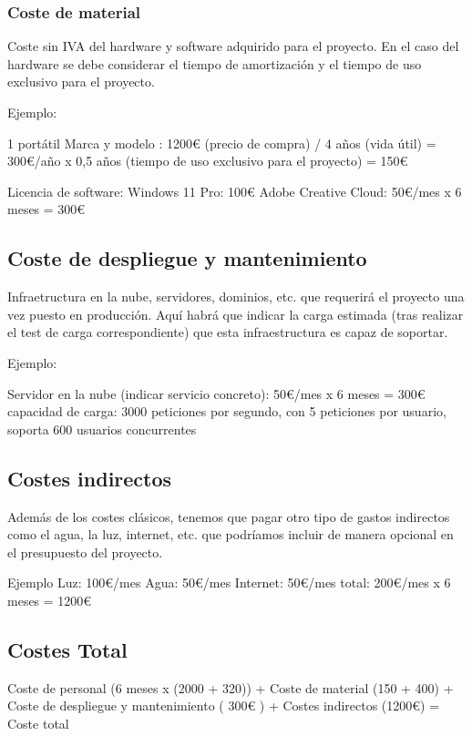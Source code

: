 \subsubsection{Coste de material}

Coste sin IVA del hardware y software adquirido para el proyecto.
En el caso del hardware se debe considerar el tiempo de amortización y el tiempo de uso exclusivo para el proyecto.

Ejemplo:

1 portátil Marca y modelo : 1200€ (precio de compra) / 4 años (vida útil) = 300€/año x 0,5 años (tiempo de uso exclusivo para el proyecto) = 150€

Licencia de software: 
Windows 11 Pro: 100€
Adobe Creative Cloud: 50€/mes x 6 meses = 300€


\subsection{Coste de despliegue y mantenimiento}

Infraetructura en la nube, servidores, dominios, etc. que requerirá el proyecto una vez puesto en producción. Aquí habrá que indicar la carga estimada (tras realizar el test de carga correspondiente) que esta infraestructura es capaz de soportar.

Ejemplo:

Servidor en la nube (indicar servicio concreto): 50€/mes x 6 meses = 300€
    capacidad de carga: 3000 peticiones por segundo, con 5 peticiones por usuario, soporta 600 usuarios concurrentes
        
\subsection{Costes indirectos}

Además de los costes clásicos, tenemos que pagar otro tipo de gastos indirectos como el agua, la luz, internet, etc. que podríamos incluir de manera opcional en el presupuesto del proyecto.

Ejemplo
    Luz: 100€/mes
    Agua: 50€/mes 
    Internet: 50€/mes
    total: 200€/mes x 6 meses = 1200€

\subsection{Costes Total}

Coste de personal (6 meses x (2000 + 320)) + Coste de material (150 + 400) + Coste de despliegue y mantenimiento ( 300€ ) + Costes indirectos (1200€) = Coste total 
